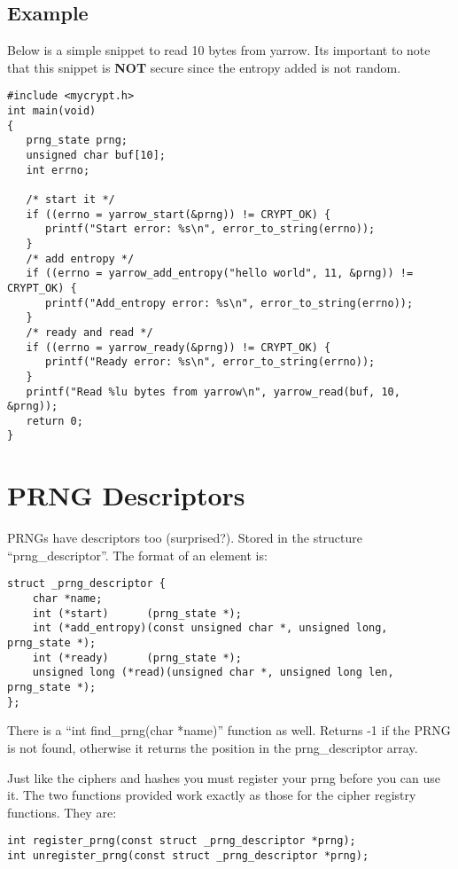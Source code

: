 \documentclass{book}
\begin{document}
\subsection{Example}

Below is a simple snippet to read 10 bytes from yarrow.  Its important to note that this snippet is {\bf NOT} secure since
the entropy added is not random.

\begin{verbatim}
#include <mycrypt.h>
int main(void)
{
   prng_state prng;
   unsigned char buf[10];
   int errno;
   
   /* start it */
   if ((errno = yarrow_start(&prng)) != CRYPT_OK) {
      printf("Start error: %s\n", error_to_string(errno));
   }
   /* add entropy */
   if ((errno = yarrow_add_entropy("hello world", 11, &prng)) != CRYPT_OK) {
      printf("Add_entropy error: %s\n", error_to_string(errno));
   }
   /* ready and read */
   if ((errno = yarrow_ready(&prng)) != CRYPT_OK) {
      printf("Ready error: %s\n", error_to_string(errno));
   }
   printf("Read %lu bytes from yarrow\n", yarrow_read(buf, 10, &prng));
   return 0;
}
\end{verbatim}

\section{PRNG Descriptors}
PRNGs have descriptors too (surprised?). Stored in the structure ``prng\_descriptor''.  The format of an element is:
\begin{verbatim}
struct _prng_descriptor {
    char *name;
    int (*start)      (prng_state *);
    int (*add_entropy)(const unsigned char *, unsigned long, prng_state *);
    int (*ready)      (prng_state *);
    unsigned long (*read)(unsigned char *, unsigned long len, prng_state *);
};
\end{verbatim}

There is a ``int find\_prng(char *name)'' function as well.  Returns -1 if the PRNG is not found, otherwise it returns
the position in the prng\_descriptor array.

Just like the ciphers and hashes you must register your prng before you can use it.  The two functions provided work
exactly as those for the cipher registry functions.  They are:
\begin{verbatim}
int register_prng(const struct _prng_descriptor *prng);
int unregister_prng(const struct _prng_descriptor *prng);
\end{verbatim}
\end{document}
